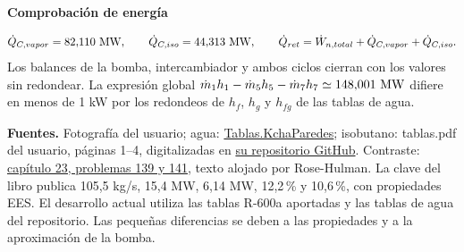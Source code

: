 \documentclass[10pt,a4paper]{article}
\newcommand{\subheading}[1]{\par\vspace{3pt}\textbf{#1}\par}
\begin{document}
\subheading{Comprobación de energía}
\[
\dot Q_{C,vapor}=\QCFlash\ \mathrm{MW},\qquad
\dot Q_{C,iso}=\QCIso\ \mathrm{MW},\qquad
\dot Q_{ret}=\dot W_{n,total}+\dot Q_{C,vapor}+\dot Q_{C,iso}.
\]
Los balances de la bomba, intercambiador y ambos ciclos cierran con los valores sin redondear. La expresión global $\dot m_1h_1-\dot m_5h_5-\dot m_7h_7\simeq\QGeo\ \mathrm{MW}$ difiere en menos de 1 kW por los redondeos de $h_f$, $h_g$ y $h_{fg}$ de las tablas de agua.

{\footnotesize\raggedright\textbf{Fuentes.} Fotografía del usuario; agua: \href{https://github.com/dilmar231gabriel-ops/Tablas.KchaParedes}{Tablas.KchaParedes}; isobutano: tablas.pdf del usuario, páginas 1--4, digitalizadas en \href{https://github.com/Aquiles-ryp360/Tablas.KchaParedesbykiles/tree/main/data/r600a}{su repositorio GitHub}. Contraste: \href{https://www.rose-hulman.edu/ES202/Chapter\%2023\%20of\%20Text/chapter23.pdf}{capítulo 23, problemas 139 y 141}, texto alojado por Rose-Hulman. La clave del libro publica 105,5 kg/s, 15,4 MW, 6,14 MW, 12,2\,\% y 10,6\,\%, con propiedades EES. El desarrollo actual utiliza las tablas R-600a aportadas y las tablas de agua del repositorio. Las pequeñas diferencias se deben a las propiedades y a la aproximación de la bomba.\par}
\end{document}
